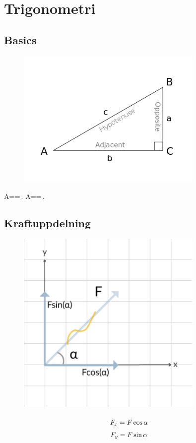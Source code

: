 \section{Trigonometri}
\subsection{Basics}
\begin{figure}
    \includegraphics[width=0.8\textwidth]{../img/trig_basic}
\end{figure}

\sin A==\,.
\cos A==\,.

\subsection{Kraftuppdelning}

\begin{figure}
    \includegraphics[width=0.8\textwidth]{../img/uppdelning}
\end{figure}

\[\begingroup \renewcommand*{\arraystretch}{1.5} \begin{matrix} F_x = F\cos{\alpha}\\ F_y = F\sin{\alpha}\\ \end{matrix} \endgroup\]